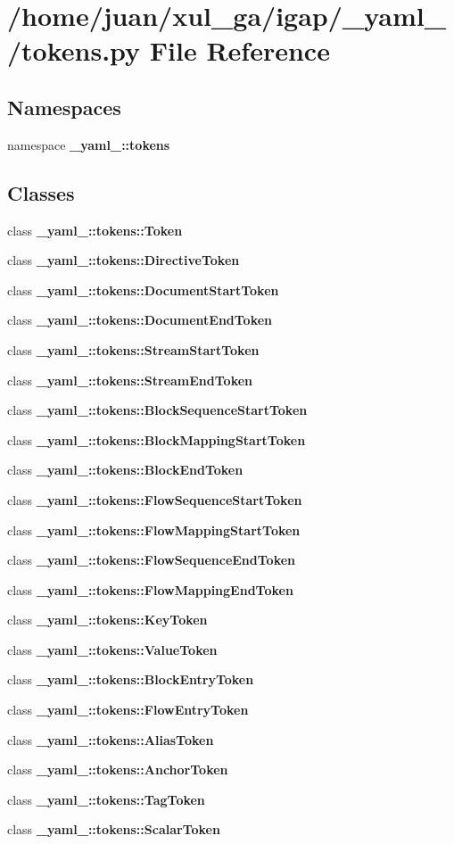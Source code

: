 \section{/home/juan/xul\_\-ga/igap/\_\-yaml\_\-/tokens.py File Reference}
\label{tokens_8py}
\subsection*{Namespaces}
\begin{CompactItemize}
\item 
namespace {\bf \_\-yaml\_\-::tokens}
\end{CompactItemize}
\subsection*{Classes}
\begin{CompactItemize}
\item 
class {\bf \_\-yaml\_\-::tokens::Token}
\item 
class {\bf \_\-yaml\_\-::tokens::DirectiveToken}
\item 
class {\bf \_\-yaml\_\-::tokens::DocumentStartToken}
\item 
class {\bf \_\-yaml\_\-::tokens::DocumentEndToken}
\item 
class {\bf \_\-yaml\_\-::tokens::StreamStartToken}
\item 
class {\bf \_\-yaml\_\-::tokens::StreamEndToken}
\item 
class {\bf \_\-yaml\_\-::tokens::BlockSequenceStartToken}
\item 
class {\bf \_\-yaml\_\-::tokens::BlockMappingStartToken}
\item 
class {\bf \_\-yaml\_\-::tokens::BlockEndToken}
\item 
class {\bf \_\-yaml\_\-::tokens::FlowSequenceStartToken}
\item 
class {\bf \_\-yaml\_\-::tokens::FlowMappingStartToken}
\item 
class {\bf \_\-yaml\_\-::tokens::FlowSequenceEndToken}
\item 
class {\bf \_\-yaml\_\-::tokens::FlowMappingEndToken}
\item 
class {\bf \_\-yaml\_\-::tokens::KeyToken}
\item 
class {\bf \_\-yaml\_\-::tokens::ValueToken}
\item 
class {\bf \_\-yaml\_\-::tokens::BlockEntryToken}
\item 
class {\bf \_\-yaml\_\-::tokens::FlowEntryToken}
\item 
class {\bf \_\-yaml\_\-::tokens::AliasToken}
\item 
class {\bf \_\-yaml\_\-::tokens::AnchorToken}
\item 
class {\bf \_\-yaml\_\-::tokens::TagToken}
\item 
class {\bf \_\-yaml\_\-::tokens::ScalarToken}
\end{CompactItemize}
